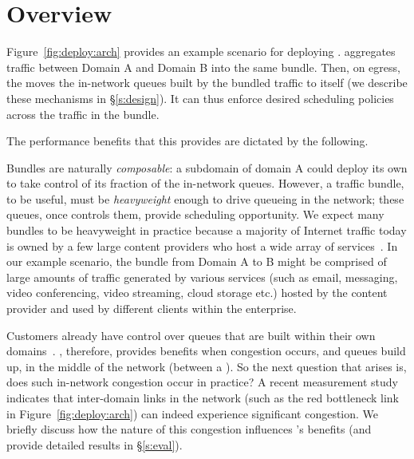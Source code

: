 \section{Overview}\label{s:deploy}


Figure~\ref{fig:deploy:arch} provides an example scenario for deploying \name. 
\name aggregates traffic between Domain A and Domain B into the same bundle. 
Then, on egress, the \inbox moves the in-network queues built by the bundled traffic to itself (we describe these mechanisms in \S\ref{s:design}). 
It can thus enforce desired scheduling policies across the traffic in the bundle.

The performance benefits that this provides are dictated by the following.

Bundles are naturally \emph{composable}: a subdomain of domain A could deploy its own \name to take control of its fraction of the in-network queues.
However, a traffic bundle, to be useful, must be \emph{heavyweight} enough to drive queueing in the network; these queues, once \name controls them, provide scheduling opportunity.
We expect many bundles to be heavyweight in practice because a majority of Internet traffic today is owned by a few large content providers who host a wide array of services~\cite{fivecomps, labovitz}. 
In our example scenario, the bundle from Domain A to B might be comprised of large amounts of traffic generated by various services (such as email, messaging, video conferencing, video streaming, cloud storage etc.) hosted by the content provider and used by different clients within the enterprise.

Customers already have control over queues that are built within their own domains~\cite{swan, b4, bwe}. \name, therefore, provides benefits when congestion occurs, and queues build up, in the middle of the network (\ie between a \pair).  
So the next question that arises is, does such in-network congestion occur in practice? A recent measurement study~\cite{inferring-interdomain-congestion} indicates that inter-domain links in the network (such as the red bottleneck link in Figure~\ref{fig:deploy:arch}) can indeed experience significant congestion. 
We briefly discuss how the nature of this congestion influences \name's benefits (and provide detailed results in \S\ref{s:eval}).

